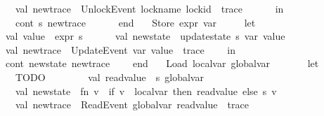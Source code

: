 \begin{isabellebody}
\ \ \ \ \ \ \ \ val\ new{\isacharunderscore}{\kern0pt}trace\ {\isacharequal}{\kern0pt}\ UnlockEvent\ {\isacharparenleft}{\kern0pt}lock{\isacharunderscore}{\kern0pt}name{\isacharcomma}{\kern0pt}\ lock{\isacharunderscore}{\kern0pt}id{\isacharparenright}{\kern0pt}\ {\isacharcolon}{\kern0pt}{\isacharcolon}{\kern0pt}\ trace\isanewline
\ \ \ \ \ \ in\isanewline
\ \ \ \ \ \ \ \ cont\ {\isacharparenleft}{\kern0pt}s{\isacharcomma}{\kern0pt}\ new{\isacharunderscore}{\kern0pt}trace{\isacharparenright}{\kern0pt}\isanewline
\ \ \ \ \ \ end\isanewline
\ \ {\isacharbar}{\kern0pt}\ Store\ {\isacharparenleft}{\kern0pt}expr{\isacharcomma}{\kern0pt}\ var{\isacharparenright}{\kern0pt}\ {\isacharequal}{\kern0pt}{\isachargreater}{\kern0pt}\isanewline
\ \ \ \ let\isanewline
\ \ \ \ \ \ val\ value\ {\isacharequal}{\kern0pt}\ expr\ s\isanewline
\ \ \ \ \ \ val\ new{\isacharunderscore}{\kern0pt}state\ {\isacharequal}{\kern0pt}\ update{\isacharunderscore}{\kern0pt}state\ s\ var\ value\isanewline
\ \ \ \ \ \ val\ new{\isacharunderscore}{\kern0pt}trace\ {\isacharequal}{\kern0pt}\ UpdateEvent\ {\isacharparenleft}{\kern0pt}var{\isacharcomma}{\kern0pt}\ value{\isacharparenright}{\kern0pt}\ {\isacharcolon}{\kern0pt}{\isacharcolon}{\kern0pt}\ trace\isanewline
\ \ \ \ in\isanewline
\ \ \ \ \ \ cont\ {\isacharparenleft}{\kern0pt}new{\isacharunderscore}{\kern0pt}state{\isacharcomma}{\kern0pt}\ new{\isacharunderscore}{\kern0pt}trace{\isacharparenright}{\kern0pt}\isanewline
\ \ \ \ end\isanewline
\ \ {\isacharbar}{\kern0pt}\ Load\ {\isacharparenleft}{\kern0pt}local{\isacharunderscore}{\kern0pt}var{\isacharcomma}{\kern0pt}\ global{\isacharunderscore}{\kern0pt}var{\isacharparenright}{\kern0pt}\ {\isacharequal}{\kern0pt}{\isachargreater}{\kern0pt}\isanewline
\ \ \ \ \ \ let\isanewline
\ \ \ \ \ \ \ \ {\isacharparenleft}{\kern0pt}{\isacharasterisk}{\kern0pt}TODO{\isacharasterisk}{\kern0pt}{\isacharparenright}{\kern0pt}\isanewline
\ \ \ \ \ \ \ \ val\ read{\isacharunderscore}{\kern0pt}value\ {\isacharequal}{\kern0pt}\ s\ global{\isacharunderscore}{\kern0pt}var\isanewline
\ \ \ \ \ \ \ \ val\ new{\isacharunderscore}{\kern0pt}state\ {\isacharequal}{\kern0pt}\ fn\ v\ {\isacharequal}{\kern0pt}{\isachargreater}{\kern0pt}\ if\ v\ {\isacharequal}{\kern0pt}\ local{\isacharunderscore}{\kern0pt}var\ then\ read{\isacharunderscore}{\kern0pt}value\ else\ s\ v\isanewline
\ \ \ \ \ \ \ \ val\ new{\isacharunderscore}{\kern0pt}trace\ {\isacharequal}{\kern0pt}\ ReadEvent\ {\isacharparenleft}{\kern0pt}global{\isacharunderscore}{\kern0pt}var{\isacharcomma}{\kern0pt}\ read{\isacharunderscore}{\kern0pt}value{\isacharparenright}{\kern0pt}\ {\isacharcolon}{\kern0pt}{\isacharcolon}{\kern0pt}\ trace\isanewline

\end{isabellebody}
